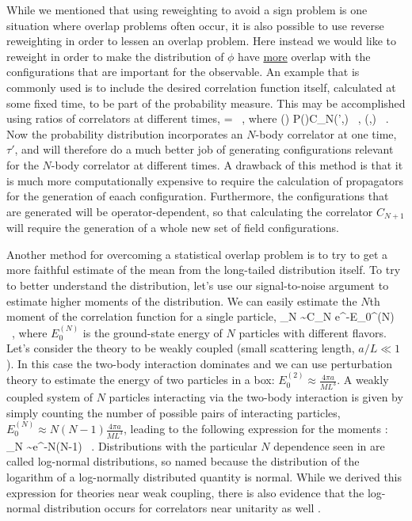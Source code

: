 While we mentioned that using reweighting to avoid a sign problem is one situation where overlap problems often occur, it is also possible to use reverse reweighting in order to lessen an overlap problem. Here instead we would like to reweight in order to make the distribution of $\phi$ have \underline{more} overlap with the configurations that are important for the observable. An example that is commonly used is to include the desired correlation function itself, calculated at some fixed time, to be part of the probability measure. This may be accomplished using ratios of correlators at different times,
\beq
{} =  \ ,
\eeq
where
\beq
{}(\phi) \equiv P(\phi)C_N(\tau',\phi) \ , \qquad \tilde{\calO}(\phi,\tau) \equiv {} \ .
\eeq
Now the probability distribution incorporates an $N$-body correlator at one time, $\tau'$, and will therefore do a much better job of generating configurations relevant for the $N$-body correlator at different times. A drawback of this method is that it is much more computationally expensive to require the calculation of propagators for the generation of eaach configuration. Furthermore, the configurations that are generated will be operator-dependent, so that calculating the correlator $C_{N+1}$ will require the generation of a whole new set of field configurations.

Another method for overcoming a statistical overlap problem is to try to get a more faithful estimate of the mean from the long-tailed distribution itself. To try to better understand the distribution, let's use our signal-to-noise argument to estimate higher moments of the distribution. We can easily estimate the $N$th moment of the correlation function for a single particle,
\beq
\calM_N \sim C_{N} \underset{\tau\to\infty}{\sim} e^{-E_0^{(N)}\tau} \ ,
\eeq
where $E_0^{(N)}$ is the ground-state energy of $N$ particles with different flavors. Let's consider the theory to be weakly coupled (small scattering length, $a/L \ll 1$). In this case the two-body interaction dominates and we can use perturbation theory to estimate the energy of two particles in a box: $E_0^{(2)} \approx \frac{4\pi a}{ML^3}$. A weakly coupled system of $N$ particles interacting via the two-body interaction is given by simply counting the number of possible pairs of interacting particles, $E_0^{(N)} \approx N(N-1) \frac{4\pi a}{ML^3}$, leading to the following expression for the moments \cite{DeGrand:2012ik}:
\beq
\label{eq:lnmoments}
\calM_N \sim e^{-N(N-1) } \ .
\eeq
Distributions with the particular $N$ dependence seen in  are called log-normal distributions, so named because the distribution of the logarithm of a log-normally distributed quantity is normal. While we derived this expression for theories near weak coupling, there is also evidence that the log-normal distribution occurs for correlators near unitarity as well \cite{Nicholson:2012zp,Nicholson:2015zxa}. 

